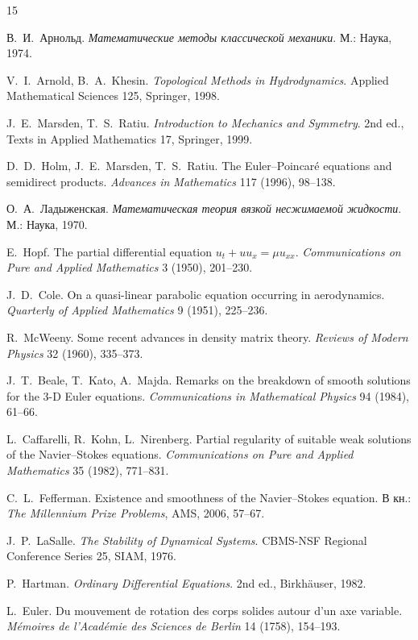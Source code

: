 \documentclass[10pt,a4paper]{article}
\theoremstyle{plain}
\theoremstyle{definition}
\theoremstyle{remark}
\numberwithin{equation}{section}
\begin{document}
\tableofcontents
\newpage










\begin{thebibliography}{15}
\small
\raggedright

 В.~И.~Арнольд. \emph{Математические методы классической механики}. М.: Наука, 1974.

 V.~I.~Arnold, B.~A.~Khesin. \emph{Topological Methods in Hydrodynamics}. Applied Mathematical Sciences 125, Springer, 1998.

 J.~E.~Marsden, T.~S.~Ratiu. \emph{Introduction to Mechanics and Symmetry}. 2nd ed., Texts in Applied Mathematics 17, Springer, 1999.

 D.~D.~Holm, J.~E.~Marsden, T.~S.~Ratiu. The Euler--Poincar\'e equations and semidirect products. \emph{Advances in Mathematics} 117 (1996), 98--138.

 О.~А.~Ладыженская. \emph{Математическая теория вязкой несжимаемой жидкости}. М.: Наука, 1970.

 E.~Hopf. The partial differential equation $u_t+uu_x=\mu u_{xx}$. \emph{Communications on Pure and Applied Mathematics} 3 (1950), 201--230.

 J.~D.~Cole. On a quasi-linear parabolic equation occurring in aerodynamics. \emph{Quarterly of Applied Mathematics} 9 (1951), 225--236.

 R.~McWeeny. Some recent advances in density matrix theory. \emph{Reviews of Modern Physics} 32 (1960), 335--373.

 J.~T.~Beale, T.~Kato, A.~Majda. Remarks on the breakdown of smooth solutions for the 3-D Euler equations. \emph{Communications in Mathematical Physics} 94 (1984), 61--66.

 L.~Caffarelli, R.~Kohn, L.~Nirenberg. Partial regularity of suitable weak solutions of the Navier--Stokes equations. \emph{Communications on Pure and Applied Mathematics} 35 (1982), 771--831.

 C.~L.~Fefferman. Existence and smoothness of the Navier--Stokes equation. В кн.: \emph{The Millennium Prize Problems}, AMS, 2006, 57--67.

 J.~P.~LaSalle. \emph{The Stability of Dynamical Systems}. CBMS-NSF Regional Conference Series 25, SIAM, 1976.

 P.~Hartman. \emph{Ordinary Differential Equations}. 2nd ed., Birkh\"auser, 1982.

 L.~Euler. Du mouvement de rotation des corps solides autour d'un axe variable. \emph{M\'emoires de l'Acad\'emie des Sciences de Berlin} 14 (1758), 154--193.

\end{thebibliography}
\end{document}
